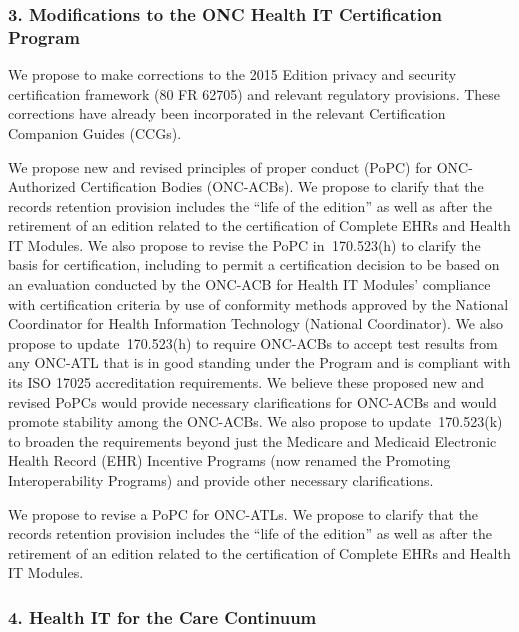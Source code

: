 \documentclass[twoside,11pt]{article}
\begin{document}
          \subsubsection{3. Modifications to the ONC Health IT Certification Program}

          We propose to make corrections to the 2015 Edition privacy and security certification framework (80 FR 62705) and relevant regulatory provisions. These corrections have already been incorporated in the relevant Certification Companion Guides (CCGs).


          We propose new and revised principles of proper conduct (PoPC) for ONC-Authorized Certification Bodies (ONC-ACBs). We propose to clarify that the records retention provision includes the “life of the edition” as well as after the retirement of an edition related to the certification of Complete EHRs and Health IT Modules. We also propose to revise the PoPC in \textsection{} 170.523(h) to clarify the basis for certification, including to permit a certification decision to be based on an evaluation conducted by the ONC-ACB for Health IT Modules' compliance with certification criteria by use of conformity methods approved by the National Coordinator for Health Information Technology (National Coordinator). We also propose to update \textsection{} 170.523(h) to require ONC-ACBs to accept test results from any ONC-ATL that is in good standing under the Program and is compliant with its ISO 17025 accreditation requirements. We believe these proposed new and revised PoPCs would provide necessary clarifications for ONC-ACBs and would promote stability among the ONC-ACBs. We also propose to update \textsection{} 170.523(k) to broaden the requirements beyond just the Medicare and Medicaid Electronic Health Record (EHR) Incentive Programs (now renamed the Promoting Interoperability Programs) and provide other necessary clarifications.


          We propose to revise a PoPC for ONC-ATLs. We propose to clarify that the records retention provision includes the “life of the edition” as well as after the retirement of an edition related to the certification of Complete EHRs and Health IT Modules.


          \subsubsection{4. Health IT for the Care Continuum}
\end{document}
